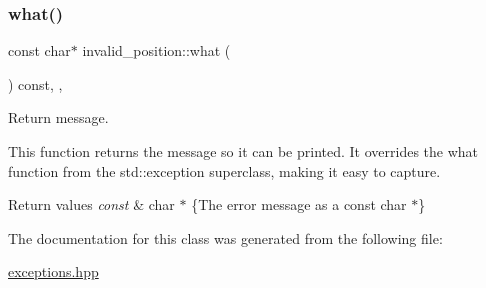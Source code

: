 \subsubsection{\texorpdfstring{what()}{what()}}
{\footnotesize\ttfamily const char$\ast$ invalid\+\_\+position\+::what (\begin{DoxyParamCaption}{ }\end{DoxyParamCaption}) const\hspace{0.3cm}{\ttfamily [inline]}, {\ttfamily [override]}, {\ttfamily [noexcept]}}



Return message. 

This function returns the message so it can be printed. It overrides the what function from the std\+::exception superclass, making it easy to capture.


\begin{DoxyRetVals}{Return values}
{\em const} & char $\ast$ \{The error message as a const char $\ast$\} \\
\hline
\end{DoxyRetVals}


The documentation for this class was generated from the following file\+:\begin{DoxyCompactItemize}
\item 
\hyperlink{exceptions_8hpp}{exceptions.\+hpp}\end{DoxyCompactItemize}
